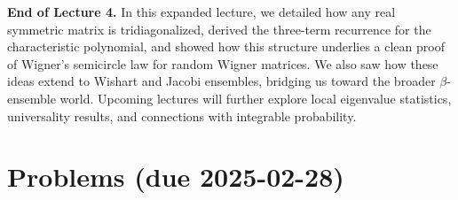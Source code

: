 \documentclass[letterpaper,11pt,oneside,reqno]{article}
\numberwithin{equation}{section}
\theoremstyle{definition}
\begin{document}
\bigskip
\noindent
\textbf{End of Lecture 4.} In this expanded lecture, we detailed how any real symmetric matrix is tridiagonalized, derived the three-term recurrence for the characteristic polynomial, and showed how this structure underlies a clean proof of Wigner’s semicircle law for random Wigner matrices. We also saw how these ideas extend to Wishart and Jacobi ensembles, bridging us toward the broader \(\beta\)-ensemble world. Upcoming lectures will further explore local eigenvalue statistics, universality results, and connections with integrable probability.





\appendix
\setcounter{section}{3}

\section{Problems (due 2025-02-28)}
\end{document}
